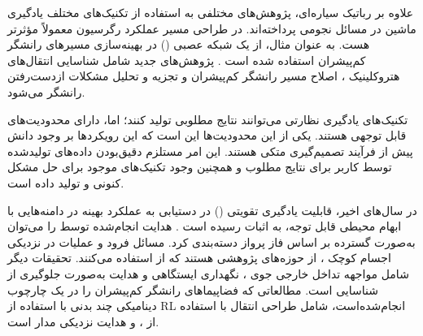 \documentclass[a4paper]{article}
\begin{document}
{علاوه بر رباتیک سیاره‌ای، پژوهش‌های مختلفی به استفاده از تکنیک‌های مختلف یادگیری ماشین در مسائل نجومی پرداخته‌اند. در طراحی مسیر عملکرد رگرسیون معمولاً مؤثرتر هست. به عنوان مثال، از یک شبکه عصبی () در بهینه‌سازی مسیرهای رانشگر کم‌پیشران استفاده شده است 
\cite{dachwald2004evolutionary}.
 پژوهش‌های جدید شامل شناسایی انتقال‌های هتروکلینیک \cite{desmet2019identifying}، اصلاح مسیر رانشگر کم‌پیشران \cite{parrish2018lowthrust} و تجزیه و تحلیل مشکلات ازدست‌رفتن رانشگر \cite{rubinsztejn2020neural} می‌شود.
 
تکنیک‌های یادگیری نظارتی می‌توانند نتایج مطلوبی تولید کنند؛ اما، دارای محدودیت‌های قابل توجهی هستند. یکی از این محدودیت‌ها این است که این رویکردها بر وجود دانش پیش از فرآیند تصمیم‌گیری متکی هستند. این امر مستلزم دقیق‌بودن داده‌های تولید‌شده توسط کاربر برای نتایج مطلوب و همچنین وجود تکنیک‌های موجود برای حل مشکل کنونی و تولید داده است.

  
  در سال‌های اخیر، قابلیت یادگیری تقویتی () در دستیابی به عملکرد بهینه در دامنه‌هایی با ابهام محیطی قابل توجه، به اثبات رسیده است  \cite{heess2017emergence, silver2017mastering}.
  هدایت انجام‌شده توسط  را می‌توان به‌صورت گسترده بر اساس فاز پرواز دسته‌بندی کرد.
  مسائل فرود \cite{furfaro2020adaptive, gaudet2020deep} 
   و عملیات در نزدیکی اجسام کوچک
   \cite{gaudet2020terminal, gaudet2020six}،
    از حوزه‌های پژوهشی هستند که از  استفاده می‌کنند.
  تحقیقات دیگر شامل مواجهه تداخل خارجی جوی \cite{gaudet2020reinforcement}،
   نگهداری ایستگاهی \cite{guzzetti2019reinforcement}  و هدایت به‌صورت جلوگیری از شناسایی \cite{reiter2020augmenting} است.
  مطالعاتی که فضاپیماهای رانشگر کم‌پیشران را در یک چارچوب دینامیکی چند بدنی با استفاده از RL انجام‌شده‌است، شامل طراحی انتقال با استفاده از  
   \cite{dasstuart2020rapid}، 
     \cite{miller2019lowthrust}
      و  هدایت نزدیکی مدار  \cite{sullivan2020using} است.
      
}
\end{document}
